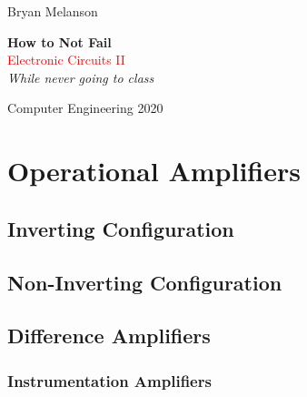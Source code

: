 \documentclass[11pt]{article}
\newcommand*{\plogo}{\fbox{$\mathcal{BM}$}}
\begin{document}
 
        
    \begin{titlepage}
    
        \raggedleft
        
        \vspace*{\baselineskip}
        
        {\Large Bryan Melanson}
        
        \vspace*{0.167\textheight}
        
        \textbf{\LARGE How to Not Fail}\\[\baselineskip]
        
        {\textcolor{Red}{\Huge Electronic Circuits II}}\\[\baselineskip]
        
        {\Large \textit{While never going to class}}
        
        \vfill
        
        {\large Computer Engineering 2020 ~~\plogo}
        
        \vspace*{3\baselineskip}
    
    \end{titlepage}

    \pagebreak
    
    \tableofcontents

    \section{Operational Amplifiers}
    \subsection{Inverting Configuration}
    \subsection{Non-Inverting Configuration}
    \subsection{Difference Amplifiers}
    \subsubsection{Instrumentation Amplifiers}
\end{document}
